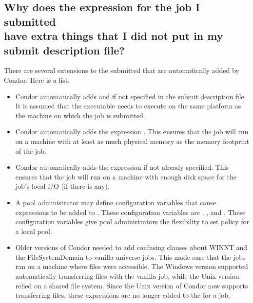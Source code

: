 \subsection*{Why does the  expression for the job I submitted\\
have extra things that I did not put in my submit description file?}
There are several extensions to the submitted 
that are automatically added by Condor.
Here is a list:
\begin{itemize}
  \item Condor automatically adds  and  if 
  not specified in the submit description file. It is assumed that
  the executable needs to execute on the same platform as the machine
  on which the job is submitted.

  \item Condor automatically adds the expression
  .
  This ensures that the job will run on a machine with at
  least as much physical memory as the memory footprint of the job.

  \item Condor automatically adds the expression
   if not already specified.
  This ensures that the job will run on a machine with enough disk
  space for the job's local I/O (if there is any).

  \item A pool administrator may define configuration variables that
  cause expressions to be added to .
  These configuration variables are ,
  , and .
  These configuration variables give
  pool administrators the flexibility to set policy for a local pool.

  \item Older versions of Condor needed to add confusing clauses
  about WINNT and the FileSystemDomain to vanilla universe jobs.
  This made sure that the jobs ran on a machine where files were
  accessible.
  The Windows version supported automatically transferring files
  with the vanilla job,
  while the Unix version relied on a shared file system.
  Since the Unix version of Condor now supports transferring files,
  these expressions are no longer added to the
   for a job.
\end{itemize}



